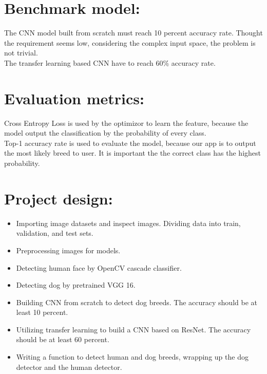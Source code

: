 \documentclass{article}
\begin{document}
\begin{normalsize}
    	\section{Benchmark model:}
        
        The CNN model built from scratch must reach 10 percent accuracy rate. Thought the requirement seems low, considering the complex input space, the problem is not trivial.\\
        The transfer learning based CNN have to reach 60\% accuracy rate.
        
        \section{Evaluation metrics:}
        
        Cross Entropy Loss is used by the optimizor to learn the feature, because the model output the classification by the probability of every class. \\
        Top-1 accuracy rate is used to evaluate the model, because our app is to output the most likely breed to user. It is important the the correct class has the highest probability.
        
        \section{Project design:}
        
        \begin{itemize}
        	\item Importing image datasets and inspect images. Dividing data into train, validation, and test sets.
            \item Preprocessing images for models.
            \item Detecting human face by OpenCV cascade classifier.
            \item Detecting dog by pretrained VGG 16.
            \item Building CNN from scratch to detect dog breeds. The accuracy should be at least 10 percent.
            \item Utilizing transfer learning to build a CNN based on ResNet. The accuracy should be at least 60 percent.
            \item Writing a function to detect human and dog breeds, wrapping up the dog detector and the human detector.
        \end{itemize}
        
\end{normalsize}
  
\end{document}
